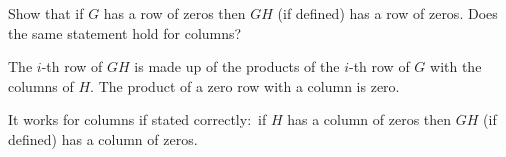 
\begin{Exercise}[
name={},
title={}, 
difficulty=0,
origin={\cite{JH}}]
    Show that if \( G \) has a row of zeros then \( GH \)
    (if defined) has a row of zeros.
    Does the same statement hold for columns?
\end{Exercise}

\begin{Answer}
      The \( i \)-th row of \( GH \) is made up of the products of
      the \( i \)-th row of \( G \) with the columns of \( H \).
      The product of a zero row with a column is zero.

      It works for columns if stated correctly:~if \( H \) has a column of
      zeros then \( GH \) (if defined) has a column of zeros.
\end{Answer}
